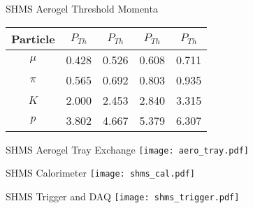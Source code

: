 \begin{Mtable}{SHMS Aerogel Threshold Momenta}
  \centering
  \begin{tabular}{|c|c|c|c|c|}
    \hline
    \textbf{Particle} & \textbf{$P_{Th}$} & \textbf{$P_{Th}$} & \textbf{$P_{Th}$} & \textbf{$P_{Th}$} \\
    \hline
    $\mu$ & 0.428 & 0.526 & 0.608 & 0.711 \\
    $\pi$ & 0.565 & 0.692 & 0.803 & 0.935 \\
    $K$ & 2.000 & 2.453 & 2.840 & 3.315 \\
    $p$ & 3.802 & 4.667 & 5.379 & 6.307 \\
    \hline
  \end{tabular}
  \caption{Threshold momenta ($P_{Th}$ in GeV/c) for a variety of charged particles and the corresponding refractive indices.}
  \label{tab:2-4_aero_threshold}
\end{Mtable}

\begin{Mfigure}{SHMS Aerogel Tray Exchange}
  \centering
  \texttt{[image: aero\_tray.pdf]}
  \caption{View of an aerogel tray being lifted out of the SHMS hut. The tray maintains its 18$\degree$ angle until it is slowly lowerd on the pallet.}
  \label{fig:2-4_aero_tray}
\end{Mfigure}

\begin{Mfigure}{SHMS Calorimeter}
  \centering
  \texttt{[image: shms\_cal.pdf]}
  \caption{View of the SHMS calorimeter which shows the preshow and shower, along with their corresponding lead glass blocks.}
  \label{fig:2-4_shms_cal}
\end{Mfigure}

%
%

\begin{Mfigure}{SHMS Trigger and DAQ}
  \centering
  \texttt{[image: shms\_trigger.pdf]}
  \caption{Overview of the SHMS trigger and DAQ system. The HMS shares a similar trigger and DAQ system.}
  \label{fig:2-5_shms_trigger}
\end{Mfigure}

